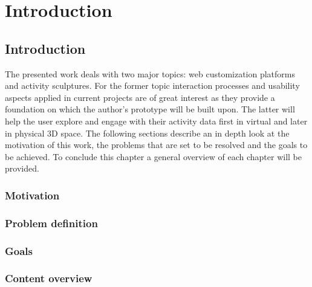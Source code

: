 \chapter{Introduction}
\label{ch:intro}

\section{Introduction}
The presented work deals with two major topics: web customization platforms and
activity sculptures. For the former topic interaction processes and usability aspects
applied in current projects are of great interest as they provide a foundation on
which the author's prototype will be built upon. The latter will help the user
explore and engage with their activity data first in virtual and later in
physical 3D space. The following sections describe an in depth look at the
motivation of this work, the problems that are set to be resolved and the goals
to be achieved. To conclude this chapter a general overview of each chapter will be
provided. 

\subsection{Motivation}

\subsection{Problem definition}
\subsection{Goals}
\subsection{Content overview}
